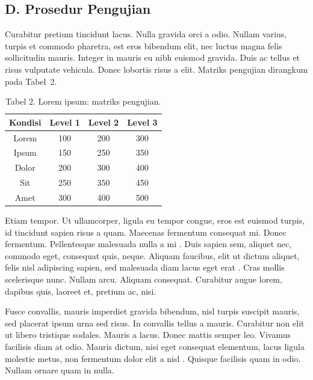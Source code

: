 \subsection{D. Prosedur Pengujian}

Curabitur pretium tincidunt lacus. Nulla gravida orci a odio. Nullam varius,
turpis et commodo pharetra, est eros bibendum elit, nec luctus magna felis
sollicitudin mauris. Integer in mauris eu nibh euismod gravida. Duis ac tellus
et risus vulputate vehicula. Donec lobortis risus a elit. Matriks pengujian
dirangkum pada Tabel~2.

\begin{table}[h]
  \caption{Tabel 2. Lorem ipsum: matriks pengujian.}
  \centering
  \begin{tabular}{cccc}
  \hline
  \textbf{Kondisi} & \textbf{Level 1} & \textbf{Level 2} & \textbf{Level 3} \\
  \hline
  Lorem   & 100 & 200 & 300 \\
  Ipsum   & 150 & 250 & 350 \\
  Dolor   & 200 & 300 & 400 \\
  Sit     & 250 & 350 & 450 \\
  Amet    & 300 & 400 & 500 \\
  \hline
  \end{tabular}
\end{table}

Etiam tempor. Ut ullamcorper, ligula eu tempor congue, eros est euismod turpis,
id tincidunt sapien risus a quam. Maecenas fermentum consequat mi. Donec
fermentum. Pellentesque malesuada nulla a mi \cite{ContohSatu2024}. Duis sapien
sem, aliquet nec, commodo eget, consequat quis, neque. Aliquam faucibus, elit ut
dictum aliquet, felis nisl adipiscing sapien, sed malesuada diam lacus eget
erat \cite{ContohBuku2011}. Cras mollis scelerisque nunc. Nullam arcu. Aliquam
consequat. Curabitur augue lorem, dapibus quis, laoreet et, pretium ac, nisi.

Fusce convallis, mauris imperdiet gravida bibendum, nisl turpis suscipit mauris,
sed placerat ipsum urna sed risus. In convallis tellus a mauris. Curabitur non
elit ut libero tristique sodales. Mauris a lacus. Donec mattis semper leo.
Vivamus facilisis diam at odio. Mauris dictum, nisi eget consequat elementum,
lacus ligula molestie metus, non fermentum dolor elit a nisl \cite{ContohDua2023}.
Quisque facilisis quam in odio. Nullam ornare quam in nulla.

\lipsum[6-12]

